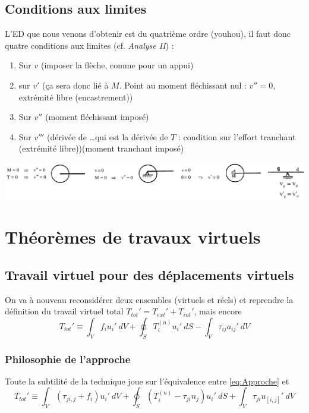 	\subsection{Conditions aux limites}
	L'ED que nous venons d'obtenir est du quatrième ordre (youhou), il faut 
	donc quatre conditions aux limites (cf. \textit{Analyse II}) :
	\begin{enumerate}
	\item Sur $v$ (imposer la flèche, comme pour un appui)
	\item sur $v'$ (ça sera donc lié à $M$. Point au moment fléchissant nul : 
	$v''=0$, extrémité libre (encastrement))
	\item Sur $v''$ (moment fléchissant imposé)
	\item Sur $v'''$ (dérivée de \dots qui est la dérivée de $T$ : condition 
	sur l'effort tranchant (extrémité libre))(moment tranchant imposé)	
	\end{enumerate}
	\begin{center}
	\includegraphics[scale=0.24]{ch9/image1}
	\end{center}


\section{Théorèmes de travaux virtuels}
	\subsection{Travail virtuel pour des déplacements virtuels}
	On va à nouveau reconsidérer deux ensembles (virtuels et réels) et 
	reprendre la définition du travail virtuel total $T_{tot}' = 
	T_{ext}'+T_{int}'$, mais encore 
	\begin{equation}
	T_{tot}' \equiv \int_V f_iu_i'\ dV + \oint_S T_i^{(n)}u_i'\ dS - 
	\int_V \tau_{ij}a_{ij}'\ dV
	\label{eq:Approche}
	\end{equation}
		
		\subsubsection{Philosophie de l'approche}
		Toute la subtilité de la technique joue sur l'équivalence entre 
		\autoref{eq:Approche} et 
		\begin{equation}
		T_{tot}' \equiv \int_V(\tau_{ji,j}+f_i)u_i'\ dV +\oint_S (T_i^{(n)}
		-\tau_{ji}n_j)u_i'\ dS + \int_V \tau_{ji}u_{[i,j]}'\ dV
		\end{equation}
		

